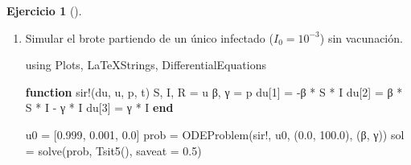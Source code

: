 \documentclass[
  spanish,
  a4paper,
]{scrreport}
\newenvironment{Shaded}{\begin{snugshade}}{\end{snugshade}}
\newcommand{\BuiltInTok}[1]{\textcolor[rgb]{0.00,0.23,0.31}{#1}}
\newcommand{\FloatTok}[1]{\textcolor[rgb]{0.68,0.00,0.00}{#1}}
\newcommand{\FunctionTok}[1]{\textcolor[rgb]{0.28,0.35,0.67}{#1}}
\newcommand{\ImportTok}[1]{\textcolor[rgb]{0.00,0.46,0.62}{#1}}
\newcommand{\KeywordTok}[1]{\textcolor[rgb]{0.00,0.23,0.31}{\textbf{#1}}}
\newcommand{\NormalTok}[1]{\textcolor[rgb]{0.00,0.23,0.31}{#1}}
\newcommand{\OperatorTok}[1]{\textcolor[rgb]{0.37,0.37,0.37}{#1}}
\theoremstyle{definition}
\newtheorem{exercise}{Ejercicio}[chapter]
\theoremstyle{remark}
\begin{document}
\begin{exercise}[]
\begin{enumerate}
\begin{tcolorbox}
\begin{verbatim}
(R0 = 2.5, umbral_rebaño = 0.6)
\end{verbatim}

  El número reproductivo es \(R_0 = 2.5\): cada infectado contagia en
  promedio a 2.5 personas. Para frenar la epidemia hay que inmunizar a
  más del \(60\%\) de la población.

  \end{tcolorbox}
\item
  Simular el brote partiendo de un único infectado (\(I_0 = 10^{-3}\))
  sin vacunación.

  \begin{tcolorbox}[enhanced jigsaw, arc=.35mm, bottomrule=.15mm, bottomtitle=1mm, breakable, colback=white, colbacktitle=quarto-callout-tip-color!10!white, colframe=quarto-callout-tip-color-frame, coltitle=black, left=2mm, leftrule=.75mm, opacityback=0, opacitybacktitle=0.6, rightrule=.15mm, title=\textcolor{quarto-callout-tip-color}{\faLightbulb}\hspace{0.5em}{Solución}, titlerule=0mm, toprule=.15mm, toptitle=1mm]

\begin{Shaded}
\begin{Highlighting}[]
\ImportTok{using} \BuiltInTok{Plots}\NormalTok{, }\BuiltInTok{LaTeXStrings}\NormalTok{, }\BuiltInTok{DifferentialEquations}

\KeywordTok{function} \FunctionTok{sir!}\NormalTok{(du, u, p, t)}
\NormalTok{    S, I, R }\OperatorTok{=}\NormalTok{ u}
\NormalTok{    β, γ }\OperatorTok{=}\NormalTok{ p}
\NormalTok{    du[}\FloatTok{1}\NormalTok{] }\OperatorTok{=} \OperatorTok{{-}}\NormalTok{β }\OperatorTok{*}\NormalTok{ S }\OperatorTok{*}\NormalTok{ I}
\NormalTok{    du[}\FloatTok{2}\NormalTok{] }\OperatorTok{=}\NormalTok{  β }\OperatorTok{*}\NormalTok{ S }\OperatorTok{*}\NormalTok{ I }\OperatorTok{{-}}\NormalTok{ γ }\OperatorTok{*}\NormalTok{ I}
\NormalTok{    du[}\FloatTok{3}\NormalTok{] }\OperatorTok{=}\NormalTok{  γ }\OperatorTok{*}\NormalTok{ I}
\KeywordTok{end}

\NormalTok{u0 }\OperatorTok{=}\NormalTok{ [}\FloatTok{0.999}\NormalTok{, }\FloatTok{0.001}\NormalTok{, }\FloatTok{0.0}\NormalTok{]}
\NormalTok{prob }\OperatorTok{=} \FunctionTok{ODEProblem}\NormalTok{(sir!, u0, (}\FloatTok{0.0}\NormalTok{, }\FloatTok{100.0}\NormalTok{), (β, γ))}
\NormalTok{sol }\OperatorTok{=} \FunctionTok{solve}\NormalTok{(prob, }\FunctionTok{Tsit5}\NormalTok{(), saveat }\OperatorTok{=} \FloatTok{0.5}\NormalTok{)}


\end{Highlighting}
\end{Shaded}
\end{tcolorbox}
\end{enumerate}
\end{exercise}
\end{document}
